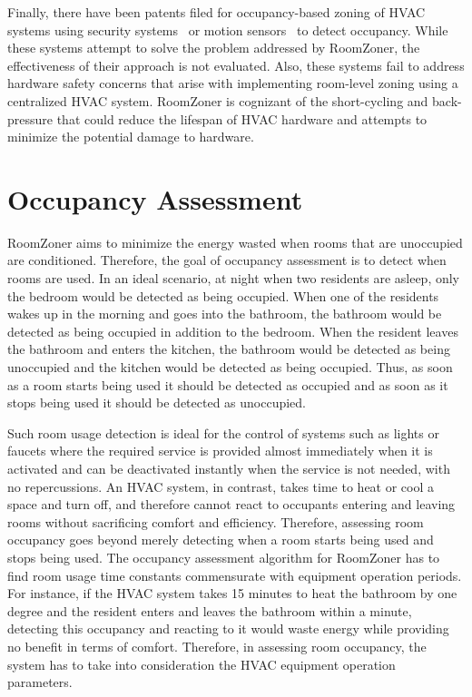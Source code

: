 Finally, there have been patents filed for occupancy-based zoning of HVAC
systems using security systems~\cite{cohen2008hvac} or motion
sensors~\cite{simmons2002energy} to detect occupancy. While these systems
attempt to solve the problem addressed by RoomZoner, the effectiveness
of their approach is not evaluated. Also, these systems fail to address hardware
safety concerns that arise with implementing room-level zoning using a
centralized HVAC system. RoomZoner is cognizant of the short-cycling and
back-pressure that could reduce the lifespan of HVAC hardware and attempts to
minimize the potential damage to hardware.

\section{Occupancy Assessment}
\label{sec:occupancyAssessment}



RoomZoner aims to minimize the energy wasted when rooms that are unoccupied are
conditioned. Therefore, the goal of occupancy assessment is to detect when rooms
are used. In an ideal scenario, at night when two residents are asleep, only the
bedroom would be detected as being occupied. When one of the residents wakes up
in the morning and goes into the bathroom, the bathroom would be detected as
being occupied in addition to the bedroom. When the resident leaves the bathroom
and enters the kitchen, the bathroom would be detected as being unoccupied and
the kitchen would be detected as being occupied. Thus, as soon as a room starts
being used it should be detected as occupied and as soon as it stops being used
it should be detected as unoccupied.


Such room usage detection is ideal for the control of systems such as lights
or faucets where the required service is provided almost immediately when it is
activated and can be deactivated instantly when the service is not needed, with
no repercussions. An HVAC system, in contrast, takes time to heat or cool a
space and turn off, and therefore cannot react to occupants entering and leaving rooms
without sacrificing comfort and efficiency. Therefore, assessing room occupancy
goes beyond merely detecting when a room starts being used and stops being
used. The occupancy assessment algorithm for RoomZoner has to find room usage
time constants commensurate with equipment operation periods. For instance, if
the HVAC system takes 15 minutes to heat the bathroom by one degree and the
resident enters and leaves the bathroom within a minute, detecting this
occupancy and reacting to it would waste energy while providing no benefit in
terms of comfort. Therefore, in assessing room occupancy, the system has to take
into consideration the HVAC equipment operation parameters.

